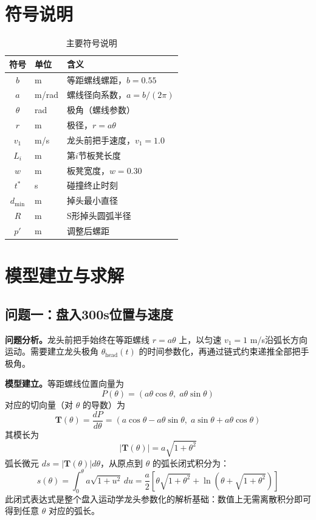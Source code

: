 \documentclass[12pt,a4paper]{article}
\begin{document}
\section{符号说明}

\begin{table}[htbp]
\centering
\caption{主要符号说明}
\begin{tabular}{clp{8cm}}
\toprule
符号 & 单位 & 含义 \\
\midrule
$b$ & m & 等距螺线螺距，$b=0.55$ \\
$a$ & m/rad & 螺线径向系数，$a=b/(2\pi)$ \\
$\theta$ & rad & 极角（螺线参数） \\
$r$ & m & 极径，$r=a\theta$ \\
$v_1$ & m/s & 龙头前把手速度，$v_1=1.0$ \\
$L_i$ & m & 第$i$节板凳长度 \\
$w$ & m & 板凳宽度，$w=0.30$ \\
$t^*$ & s & 碰撞终止时刻 \\
$d_{\min}$ & m & 掉头最小直径 \\
$R$ & m & S形掉头圆弧半径 \\
$p'$ & m & 调整后螺距 \\
\bottomrule
\end{tabular}
\end{table}

\section{模型建立与求解}

\subsection{问题一：盘入300s位置与速度}

\textbf{问题分析。}龙头前把手始终在等距螺线 $r=a\theta$ 上，以匀速 $v_1=1$ m/s沿弧长方向运动。需要建立龙头极角 $\theta_{\text{head}}(t)$ 的时间参数化，再通过链式约束递推全部把手极角。

\textbf{模型建立。}等距螺线位置向量为
\begin{equation}
P(\theta) = (a\theta\cos\theta,\; a\theta\sin\theta)
\label{eq:archimedes_pos}
\end{equation}
对应的切向量（对 $\theta$ 的导数）为
\begin{equation}
\mathbf{T}(\theta) = \frac{dP}{d\theta} = (a\cos\theta - a\theta\sin\theta,\; a\sin\theta + a\theta\cos\theta)
\label{eq:tangent}
\end{equation}
其模长为
\begin{equation}
|\mathbf{T}(\theta)| = a\sqrt{1+\theta^2}
\label{eq:tangent_norm}
\end{equation}
弧长微元 $ds = |\mathbf{T}(\theta)| d\theta$，从原点到 $\theta$ 的弧长闭式积分为：
\begin{equation}
s(\theta) = \int_0^\theta a\sqrt{1+u^2}\,du = \frac{a}{2}\left[\theta\sqrt{1+\theta^2}+\ln\left(\theta+\sqrt{1+\theta^2}\right)\right]
\label{eq:arclength}
\end{equation}
此闭式表达式是整个盘入运动学龙头参数化的解析基础：数值上无需离散积分即可得到任意 $\theta$ 对应的弧长。
\end{document}
